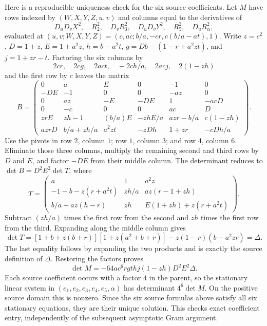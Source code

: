 Here is a reproducible uniqueness check for the six source coefficients.
Let $M$ have rows indexed by $(W,X,Y,Z,u,v)$ and columns equal to the
derivatives of
\[
D_uD_vX^2,\quad R_2^2,\quad D_vR_3^2,\quad
D_uD_vY^2,\quad R_5^2,\quad D_uR_\alpha^2,
\]
evaluated at $(u,v;W,X,Y,Z)=(c,ac;b/a,-cr,c(b/a-at),1)$.
Write $z=c^2$, $D=1+z$, $E=1+a^2z$, $h=b-a^2t$,
$g=Db-(1-r+a^2zt)$, and $j=1+zr-t$.
Factoring the six columns by
\[
2cr,\quad2cg,\quad2act,\quad-2ch/a,\quad2acj,
\quad2(1-zh)
\]
and the first row by $c$ leaves the matrix
\[
B=\begin{pmatrix}
0&a&E&0&-1&0\\
-DE&-1&0&0&-az&0\\
0&az&-E&-DE&1&-acD\\
0&-c&0&0&ac&D\\
zrE&zh-1&(b/a)E&-zhE/a&azr-b/a&c(1-zh)\\
azrD&b/a+zh/a&a^2zt&-zDh&1+zr&-cDh/a
\end{pmatrix}.
\]
Use the pivots in row $2$, column $1$; row $1$, column $3$; and
row $4$, column $6$.  Eliminate those three columns, multiply the
remaining second and third rows by $D$ and $E$, and factor $-DE$
from their middle column.  The determinant reduces to
$\det B=D^2E^2\det T$, where
\[
T=\begin{pmatrix}
a&1&a^2z\\
-1-b-z(r+a^2t)&zh/a&az(r-1+zh)\\
b/a+az(h-r)&zh&E(1+zh)+z(r+a^2t)
\end{pmatrix}.
\]
Subtract $(zh/a)$ times the first row from the second and $zh$ times
the first row from the third.  Expanding along the middle column gives
\[
\det T=[1+b+z(b+r)][1+z(a^2+b+r)]
-z(1-r)(b-a^2zr)=\Delta.
\]
The last equality follows by expanding the two products and is exactly
the source definition of $\Delta$.  Restoring the factors proves
\begin{equation}
\det M=-64a c^6rgt h j(1-zh)D^2E^2\Delta.
\label{p61209c7390b0:eq:c2-entry-determinant}
\end{equation}
Each source coefficient occurs with a factor $4$ in the parent, so the
stationary linear system in $(e_1,e_2,e_3,e_4,e_5,\alpha)$ has determinant
$4^6\det M$.  On the positive source domain this is nonzero.  Since the
six source formulas above satisfy all six stationary equations,
they are their unique solution.  This checks exact coefficient entry,
independently of the subsequent asymptotic Gram argument.
